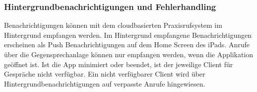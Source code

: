 \clearpage

\subsubsection{Hintergrundbenachrichtigungen und Fehlerhandling}

Benachrichtigungen können mit dem cloudbasierten Praxisrufsystem im Hintergrund empfangen werden.
Im Hintergrund empfangene Benachrichtigungen erscheinen als Push Benachrichtigungen auf dem Home Screen des iPads.
Anrufe über die Gegensprechanlage können nur empfangen werden, wenn die Applikation geöffnet ist.
Ist die App minimiert oder beendet, ist der jeweilige Client für Gespräche nicht verfügbar.
Ein nicht verfügbarer Client wird über Hintergrundbenachrichtigungen auf verpasste Anrufe hingewiesen.

\begin{figure}[h]
    \centering
    \begin{minipage}[b]{0.4\textwidth}

\end{minipage}
\end{figure}
